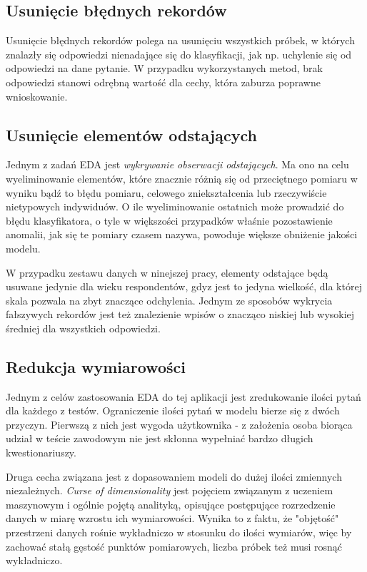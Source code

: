 \documentclass[12pt,a4paper,oneside]{report} %
\begin{document}
\subsection{Usunięcie błędnych rekordów}

Usunięcie błędnych rekordów polega na usunięciu wszystkich próbek, w których znalazły się odpowiedzi nienadające się do klasyfikacji, jak np. uchylenie się od odpowiedzi na dane pytanie. W przypadku wykorzystanych metod, brak odpowiedzi stanowi odrębną wartość dla cechy, która zaburza poprawne wnioskowanie. \par


\subsection{Usunięcie elementów odstających}

Jednym z zadań EDA jest \emph{wykrywanie obserwacji odstających}. Ma ono na celu wyeliminowanie elementów, które znacznie różnią się od przeciętnego pomiaru w wyniku bądź to błędu pomiaru, celowego zniekształcenia lub rzeczywiście nietypowych indywiduów. O ile wyeliminowanie ostatnich może prowadzić do błędu klasyfikatora, o tyle w większości przypadków właśnie pozostawienie anomalii, jak się te pomiary czasem nazywa, powoduje większe obniżenie jakości modelu. \cite{dudek} \par

W przypadku zestawu danych w ninejszej pracy, elementy odstające będą usuwane jedynie dla wieku respondentów, gdyz jest to jedyna wielkość, dla której skala pozwala na zbyt znaczące odchylenia. Jednym ze sposobów wykrycia fałszywych rekordów jest też znalezienie wpisów o znacząco niskiej lub wysokiej średniej dla wszystkich odpowiedzi. \par






\subsection{Redukcja wymiarowości}

Jednym z celów zastosowania EDA do tej aplikacji jest zredukowanie ilości pytań dla każdego z testów. Ograniczenie ilości pytań w modelu bierze się z dwóch przyczyn. Pierwszą z nich jest wygoda użytkownika - z założenia osoba biorąca udział w teście zawodowym nie jest skłonna wypełniać bardzo długich kwestionariuszy.\par

Druga cecha związana jest z dopasowaniem modeli do dużej ilości zmiennych niezależnych. \emph{Curse of dimensionality} jest pojęciem związanym z uczeniem maszynowym i ogólnie pojętą analityką, opisujące postępujące rozrzedzenie danych w miarę wzrostu ich wymiarowości. Wynika to z faktu, że "objętość" przestrzeni danych rośnie wykładniczo w stosunku do ilości wymiarów, więc by zachować stałą gęstość punktów pomiarowych, liczba próbek też musi rosnąć wykładniczo. \cite{curseofdimensionality} \par
\end{document}
